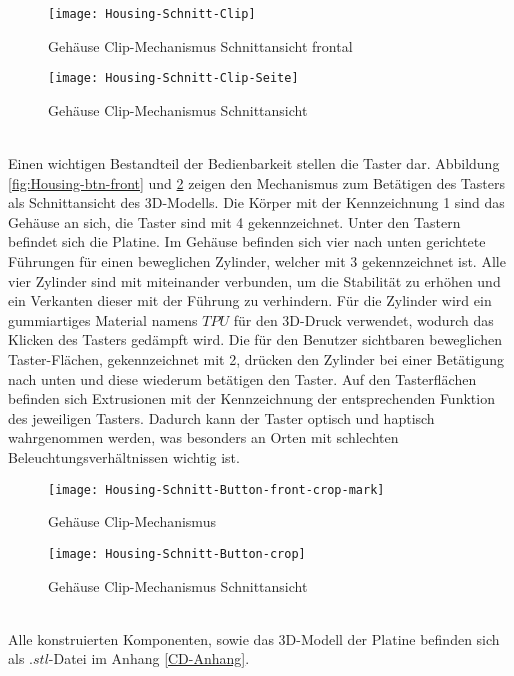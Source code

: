\begin{figure}[h]
		\begin{minipage}{.45\linewidth}
		\centering
		\texttt{[image: Housing-Schnitt-Clip]}
		\caption{Gehäuse Clip-Mechanismus Schnittansicht frontal}
		\label{fig:Housing-clip}
	\end{minipage}
	\hfill
	\begin{minipage}{.45\linewidth}
		\centering
		\texttt{[image: Housing-Schnitt-Clip-Seite]}
		\caption{Gehäuse Clip-Mechanismus Schnittansicht}
		\label{fig:Housing-clip-side}
	\end{minipage}
\end{figure}\\
Einen wichtigen Bestandteil der Bedienbarkeit stellen die Taster dar. Abbildung \ref{fig:Housing-btn-front} und \ref{fig:Housing-btn} zeigen den Mechanismus zum Betätigen des Tasters als Schnittansicht des 3D-Modells. Die Körper mit der Kennzeichnung 1 sind das Gehäuse an sich, die Taster sind mit 4 gekennzeichnet. Unter den Tastern befindet sich die Platine. Im Gehäuse befinden sich vier nach unten gerichtete Führungen für einen beweglichen Zylinder, welcher mit 3 gekennzeichnet ist. Alle vier Zylinder sind mit miteinander verbunden, um die Stabilität zu erhöhen und ein Verkanten dieser mit der Führung zu verhindern. Für die Zylinder wird ein gummiartiges Material namens $TPU$ für den 3D-Druck verwendet, wodurch das Klicken des Tasters gedämpft wird. Die für den Benutzer sichtbaren beweglichen Taster-Flächen, gekennzeichnet mit 2, drücken den Zylinder bei einer Betätigung nach unten und diese wiederum betätigen den Taster. Auf den Tasterflächen befinden sich Extrusionen mit der Kennzeichnung der entsprechenden Funktion des jeweiligen Tasters. Dadurch kann der Taster optisch und haptisch wahrgenommen werden, was besonders an Orten mit schlechten Beleuchtungsverhältnissen wichtig ist.
\begin{figure}[h]
	\begin{minipage}{.45\linewidth}
		\centering
		\texttt{[image: Housing-Schnitt-Button-front-crop-mark]}
		\caption{Gehäuse Clip-Mechanismus}
		\label{fig:Housing-btn-front}
	\end{minipage}
	\hfill
	\begin{minipage}{.45\linewidth}
		\centering
		\texttt{[image: Housing-Schnitt-Button-crop]}
		\caption{Gehäuse Clip-Mechanismus Schnittansicht}
		\label{fig:Housing-btn}
	\end{minipage}
\end{figure}\\
Alle konstruierten Komponenten, sowie das 3D-Modell der Platine befinden sich als $.stl$-Datei im Anhang \ref{CD-Anhang}.